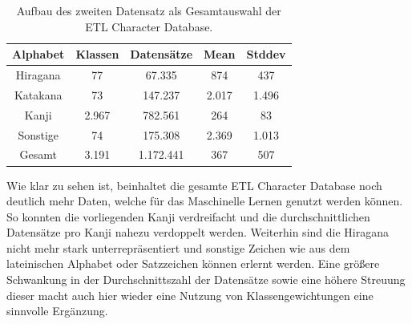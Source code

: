 \documentclass[twoside,a4paper]{IEEEtran}
\begin{document}
\begin{table}[!htb]
	\caption{Aufbau des zweiten Datensatz als Gesamtauswahl der ETL Character Database.}
	\label{data_total}
	\centering
	\begin{tabular}{|c|c|c|c|c|}
		\hline
		Alphabet & Klassen & Datensätze & Mean & Stddev\\
		\hline
		\hline
		Hiragana & 77 & 67.335 & 874 & 437\\
		\hline 
		Katakana & 73 & 147.237 & 2.017 & 1.496\\
		\hline
		Kanji & 2.967 & 782.561 & 264 & 83\\
		\hline
		Sonstige & 74 & 175.308 & 2.369 & 1.013\\
		\hline
		\hline
		Gesamt & 3.191 & 1.172.441 & 367 & 507\\
		\hline
	\end{tabular}
\end{table}
Wie klar zu sehen ist, beinhaltet die gesamte ETL Character Database noch deutlich mehr Daten, welche für das Maschinelle Lernen genutzt werden können. So konnten die vorliegenden Kanji verdreifacht und die durchschnittlichen Datensätze pro Kanji nahezu verdoppelt werden. Weiterhin sind die Hiragana nicht mehr stark unterrepräsentiert und sonstige Zeichen wie aus dem lateinischen Alphabet oder Satzzeichen können erlernt werden. Eine größere Schwankung in der Durchschnittszahl der Datensätze sowie eine höhere Streuung dieser macht auch hier wieder eine Nutzung von Klassengewichtungen eine sinnvolle Ergänzung.
\end{document}
